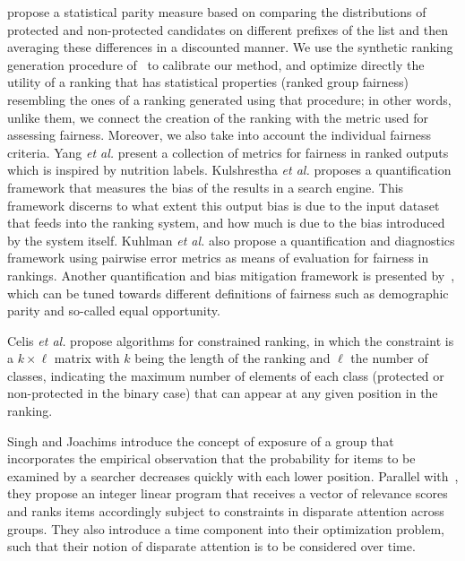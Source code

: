 \citet{yang2016measuring} propose a statistical parity measure based on comparing the distributions of protected and non-protected candidates on different prefixes of the list and then averaging these differences in a discounted manner.
%
%
%
We use the synthetic ranking generation procedure of~\citet{yang2016measuring} to calibrate our method, and optimize directly the utility of a ranking that has statistical properties (ranked group fairness) resembling the ones of a ranking generated using that procedure; in other words, unlike them, we connect the creation of the ranking with the metric used for assessing fairness.
Moreover, we also take into account the individual fairness criteria.
%
Yang {\em et al.} \citet{yang2018nutritional} present a collection of metrics for fairness in ranked outputs which is inspired by nutrition labels.
%
Kulshrestha {\em et al.} \citet{kulshrestha_2017_quantifying} proposes a quantification framework that measures the bias of the results in a search engine.
This framework discerns to what extent this output bias is due to the input dataset that feeds into the ranking system, and how much is due to the bias introduced by the system itself.
%
Kuhlman {\em et al.} \citet{kuhlman2019fare} also propose a quantification and diagnostics framework using pairwise error metrics as means of evaluation for fairness in rankings.
%
Another quantification and bias mitigation framework is presented by~\citet{geyik2019fairness}, which can be tuned towards different definitions of fairness such as demographic parity and so-called equal opportunity.

Celis {\em et al.} \citet{celis2017ranking} propose algorithms for constrained ranking, in which the constraint is a $k \times \ell$ matrix with $k$ being the length of the ranking and $\ell$ the number of classes, indicating the maximum number of elements of each class (protected or non-protected in the binary case) that can appear at any given position in the ranking.

Singh and Joachims \citet{singh2018fairness} introduce the concept of exposure of a group that incorporates the empirical observation that the probability for items to be examined by a searcher decreases quickly with each lower position.
%
Parallel with~\citet{biega2018equity}, they propose an integer linear program that receives a vector of relevance scores and ranks items accordingly subject to constraints in disparate attention across groups. They also introduce a time component into their optimization problem, such that their notion of disparate attention is to be considered over time.

